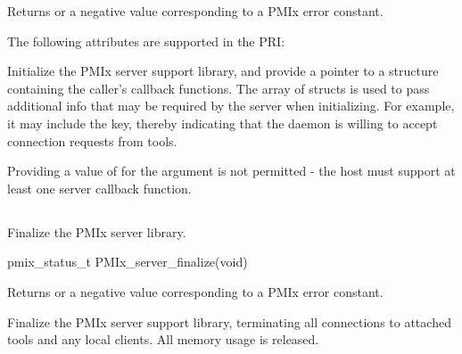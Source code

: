 \begin{arglist}
\end{arglist}

Returns  or a negative value corresponding to a PMIx error constant.

\priattr
The following attributes are supported in the \ac{PRI}:



\descr

Initialize the \ac{PMIx} server support library, and provide a pointer to a  structure containing the caller's callback functions.
The array of  structs is used to pass additional info that may be required by the server when initializing.
For example, it may include the  key, thereby indicating that the daemon is willing to accept connection requests from tools.

\adviceuserstart
Providing a value of  for the  argument is not permitted - the host must support at least one server callback function.
\adviceuserend

\subsection{}

\summary

Finalize the PMIx server library.

\format

\cspecificstart
\begin{codepar}
pmix_status_t
PMIx_server_finalize(void)
\end{codepar}
\cspecificend

Returns  or a negative value corresponding to a PMIx error constant.

\descr

Finalize the \ac{PMIx} server support library, terminating all connections to attached tools and any local clients.
All memory usage is released.

